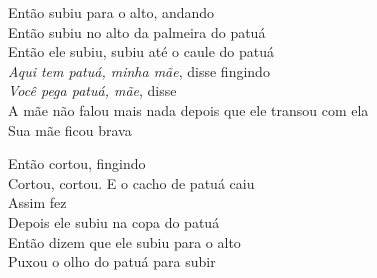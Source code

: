 \begin{linenumbers}\begingroup\raggedright
\noindent Então subiu para o alto, andando\\
Então subiu no alto da palmeira do patuá\\
Então ele subiu, subiu até o caule do patuá\\
\emph{Aqui tem patuá, minha mãe}, disse fingindo\\
\emph{Você pega patuá, mãe}, disse\\
A mãe não falou mais nada depois que ele transou com ela\\
Sua mãe ficou brava
\end{linenumbers}\endgroup

\bigskip

\begin{linenumbers}\begingroup\raggedright
\noindent Então cortou, fingindo\\
Cortou, cortou. E o cacho de patuá caiu\\
Assim fez\\
Depois ele subiu na copa do patuá\\
Então dizem que ele subiu para o alto\\
Puxou o olho do patuá para subir
\end{linenumbers}\endgroup

\bigskip

